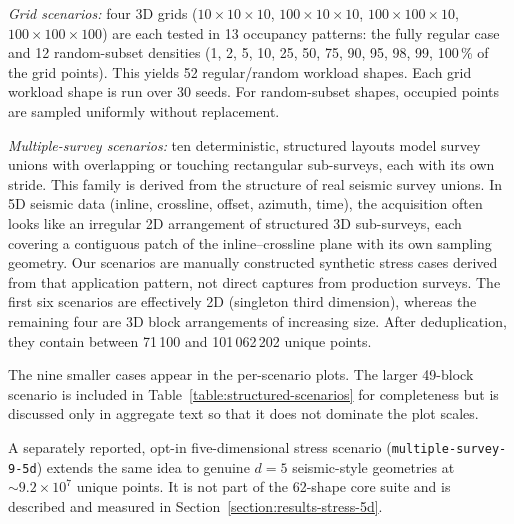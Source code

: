 \documentclass[manuscript,screen,review]{acmart}
\theoremstyle{definition}
\theoremstyle{plain}
\begin{document}
\emph{Grid scenarios:}
four 3D grids ($10{\times}10{\times}10$, $100{\times}10{\times}10$,
$100{\times}100{\times}10$, $100{\times}100{\times}100$) are each tested
in 13 occupancy patterns: the fully regular case and 12 random-subset
densities (1, 2, 5, 10, 25, 50, 75, 90, 95, 98, 99, 100\,\% of the grid
points).
This yields 52 regular/random workload shapes.
Each grid workload shape is run over 30 seeds. For random-subset
shapes, occupied points are sampled uniformly without replacement.

\emph{Multiple-survey scenarios:}
ten deterministic, structured layouts model survey unions with overlapping or touching
rectangular sub-surveys, each with its own stride.
This family is derived from the structure of real seismic survey
unions. In 5D seismic data (inline, crossline, offset, azimuth, time),
the acquisition often looks like an irregular 2D arrangement of
structured 3D sub-surveys, each covering a contiguous patch of the
inline--crossline plane with its own sampling geometry. Our scenarios
are manually constructed synthetic stress cases derived from that
application pattern, not direct captures from production surveys.
The first six scenarios are effectively 2D (singleton third dimension),
whereas the remaining four are 3D block arrangements of increasing
size.
After deduplication, they contain between 71\,100 and
101\,062\,202 unique points.

The nine smaller cases appear in the per-scenario plots. The larger
49-block scenario is included in
Table~\ref{table:structured-scenarios} for completeness but is
discussed only in aggregate text so that it does not dominate the plot
scales.

A separately reported, opt-in five-dimensional stress scenario
(\texttt{multiple-survey-9-5d}) extends the same idea to genuine
$d=5$ seismic-style geometries at $\sim\!9.2\times 10^7$ unique points.
It is not part of the 62-shape core suite and is described and measured
in Section~\ref{section:results-stress-5d}.
\end{document}
